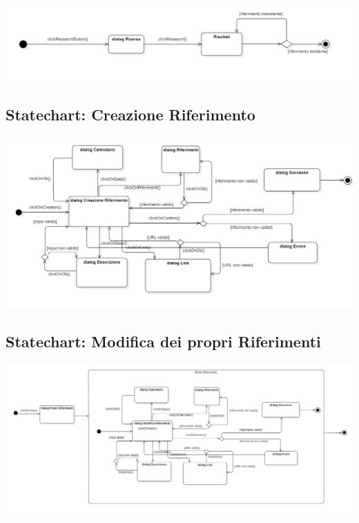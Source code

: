         \begin{center}
            \includegraphics[width=.95\textwidth]{Immagini/Alexandria/Statechart Ricerca.PNG} 
        \end{center}

\raggedright{\subsection{Statechart: Creazione Riferimento}}

        \begin{center}
            \includegraphics[width=.95\textwidth]{Immagini/Alexandria/Statechart Creazione Riferimento.PNG} 
        \end{center}

\raggedright{\subsection{Statechart: Modifica dei propri Riferimenti}}

        \begin{center}
            \includegraphics[width=.95\textwidth]{Immagini/Alexandria/Statechart Modifica Riferimento.PNG} 
        \end{center}

